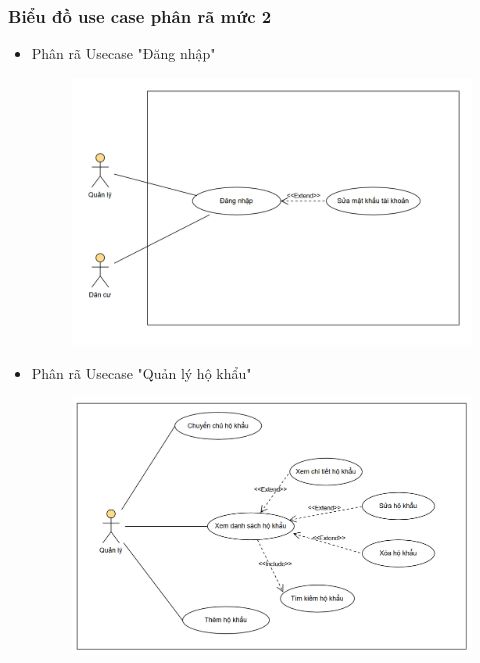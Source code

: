 \documentclass{article}
\begin{document}
\subsubsection{Biểu đồ use case phân rã mức 2}
\begin{itemize}
    \item Phân rã Usecase "Đăng nhập"
    \begin{figure}[H]
        \centering
        \includegraphics[width=1\textwidth]{Ảnh chương 2/Đăng nhập.png}
    \end{figure}
    \item Phân rã Usecase "Quản lý hộ khẩu"
    \begin{figure}[H]
        \centering
        \includegraphics[width=1\textwidth]{Ảnh chương 2/Hộ khẩu.png}
    \end{figure}


\end{itemize}
\end{document}
